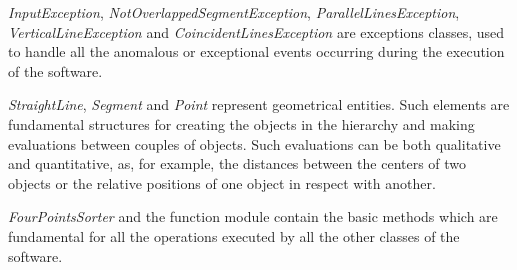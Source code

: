 		\emph{InputException}, \emph{NotOverlappedSegmentException}, \emph{ParallelLinesException}, \emph{VerticalLineException} and \emph{CoincidentLinesException} are exceptions classes, used to handle all the anomalous or exceptional events occurring during the execution of the software. 

		\emph{StraightLine}, \emph{Segment} and \emph{Point} represent geometrical entities. Such elements are fundamental structures for creating the objects in the hierarchy and making evaluations between couples of objects.
		Such evaluations can be both qualitative and quantitative, as, for example, the distances between the centers of two objects or the relative positions of one object in respect with another.

		\emph{FourPointsSorter} and the function module contain the basic methods which are fundamental for all the operations executed by all the other classes of the software.

	

